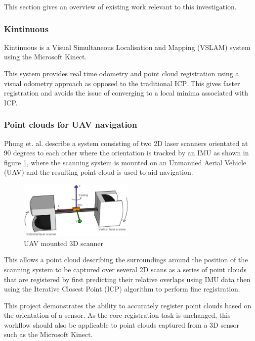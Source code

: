 \documentclass{entcs}
\begin{document}
This section gives an overview of existing work relevant to this investigation.

\subsubsection{Kintinuous}

Kintinuous \cite{Whelan2012} is a Visual Simultaneous Localisation and Mapping
(VSLAM) system using the Microsoft Kinect.

This system provides real time odometry and point cloud registration using a
visual odometry approach as opposed to the traditional ICP. This gives faster
registration and avoids the issue of converging to a local minima associated
with ICP.

\subsubsection{Point clouds for UAV navigation}

Phung et. al. \cite{Phung2016} describe a system consisting of two 2D laser
scanners orientated at 90 degrees to each other where the orientation is tracked
by an IMU as shown in figure \ref{fig:laser_scanner_imu}, where the scanning
system is mounted on an Unmanned Aerial Vehicle (UAV) and the resulting point
cloud is used to aid navigation.

\begin{figure}[h!]
  \centering
  \includegraphics[width=0.5\textwidth]{graphics/laser_scanner_imu.eps}
  \caption{UAV mounted 3D scanner}
  \label{fig:laser_scanner_imu}
\end{figure}

This allows a point cloud describing the surroundings around the position of the
scanning system to be captured over several 2D scans as a series of point clouds
that are registered by first predicting their relative overlaps using IMU data
then using the Iterative Closest Point (ICP) algorithm \cite{Chen1992} to
perform fine registration.

This project demonstrates the ability to accurately register point clouds based
on the orientation of a sensor. As the core registration task is unchanged, this
workflow should also be applicable to point clouds captured from a 3D sensor
such as the Microsoft Kinect.
\end{document}
